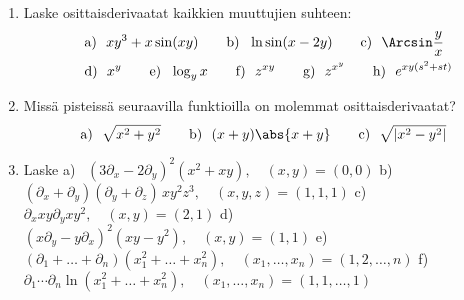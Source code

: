 \Harj
\begin{enumerate}

\item
Laske osittaisderivaatat kaikkien muuttujien suhteen:
\begin{align*}\ \
&\text{a)}\ \ xy^3+x\sin(xy) \qquad
 \text{b)}\ \ \ln\sin(x-2y) \qquad
 \text{c)}\ \ \Arcsin\frac{y}{x} \\
&\text{d)}\ \ x^y \qquad
 \text{e)}\ \ \log_y x \qquad
 \text{f)}\ \ z^{xy} \qquad
 \text{g)}\ \ z^{x^y} \qquad
 \text{h)}\ \ e^{xy(s^2+st)}
\end{align*}

\item
Missä pisteissä seuraavilla funktioilla on molemmat osittaisderivaatat?
\[
\text{a)}\ \ \sqrt{x^2+y^2} \qquad
\text{b)}\ \ (x+y)\abs{x+y} \qquad
\text{c)}\ \ \sqrt{|x^2-y^2|}
\]

\item
Laske \vspace{1mm}\newline
a) \ $(3\partial_x-2\partial_y)^2 (x^2+xy), \quad (x,y)=(0,0)$ \vspace{1mm}\newline
b) \ $(\partial_x+\partial_y)(\partial_y+\partial_z)\,xy^2z^3, \quad 
                                                   (x,y,z)=(1,1,1)$ \vspace{1mm}\newline
c) \ $\partial_x xy \partial_y xy^2, \quad (x,y)=(2,1)$ \vspace{1mm}\newline
d) \ $(x\partial_y-y\partial_x)^2 (xy-y^2), \quad (x,y)=(1,1)$ \vspace{1mm}\newline
e) \ $(\partial_1+\ldots+\partial_n)(x_1^2+\ldots+x_n^2), \quad 
                                   (x_1,\ldots,x_n)=(1,2,\ldots,n)$ \vspace{1mm}\newline
f) \ $\partial_1\cdots\partial_n \ln(x_1^2+\ldots+x_n^2), \quad 
                                    (x_1,\ldots,x_n)=(1,1,\ldots,1)$


\end{enumerate}
